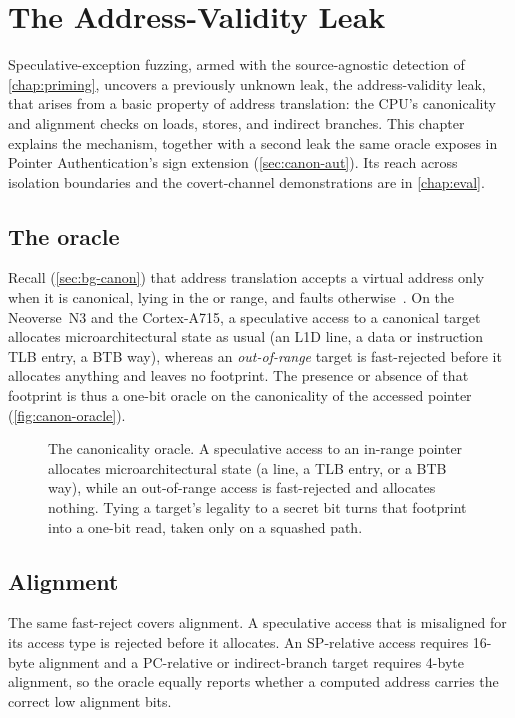 \chapter{The Address-Validity Leak}
\label{chap:canon}

Speculative-exception fuzzing, armed with the source-agnostic detection of \autoref{chap:priming},
uncovers a previously unknown leak, the address-validity leak, that arises from a basic property
of address translation: the CPU's canonicality and alignment checks on loads, stores, and
indirect branches. This chapter explains the mechanism, together with a second leak the same oracle exposes in Pointer Authentication's sign extension (\autoref{sec:canon-aut}). Its reach across isolation boundaries and
the covert-channel demonstrations are in \autoref{chap:eval}.

\section{The oracle}
\label{sec:canon-oracle}

Recall (\autoref{sec:bg-canon}) that address translation accepts a virtual address only when it is
canonical, lying in the  or  range, and faults otherwise~\cite{arm_vmsa}. On the Neoverse~N3 and the Cortex-A715, a speculative
access to a canonical target allocates microarchitectural state as usual (an L1D line, a data or
instruction TLB entry, a BTB way), whereas an \emph{out-of-range} target is fast-rejected before it
allocates anything and leaves no footprint. The presence or absence of that footprint is thus a
one-bit oracle on the canonicality of the accessed pointer (\autoref{fig:canon-oracle}).

\begin{figure}[t]
\centering
\fitwidth{}
\caption{The canonicality oracle. A speculative access to an in-range pointer allocates
microarchitectural state (a line, a TLB entry, or a BTB way), while an out-of-range access is
fast-rejected and allocates nothing. Tying a target's legality to a secret bit turns that footprint
into a one-bit read, taken only on a squashed path.}
\label{fig:canon-oracle}
\end{figure}

\section{Alignment}
\label{sec:canon-alignment}

The same fast-reject covers alignment. A speculative access that is misaligned for its access type
is rejected before it allocates. An SP-relative access requires 16-byte alignment and a
PC-relative or indirect-branch target requires 4-byte alignment, so the oracle equally reports
whether a computed address carries the correct low alignment bits.

